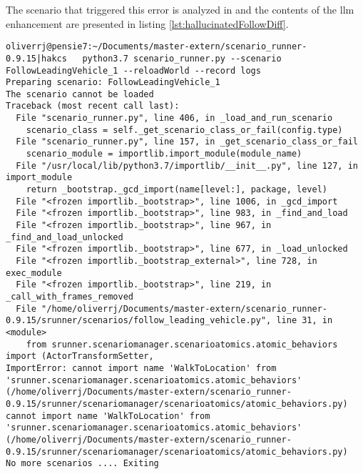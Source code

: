 The scenario that triggered this error is analyzed in  and the
contents of the \acrshort{llm} enhancement are presented in listing
\ref{lst:hallucinatedFollowDiff}.


\begin{lstlisting}[caption={Error message when running the the strictly enhanced  FollowLeadingVehicle scenario with halluciantion. }, label={lst:hallucinatedFollowErrorStrict}]
oliverrj@pensie7:~/Documents/master-extern/scenario_runner-0.9.15|hakcs   python3.7 scenario_runner.py --scenario FollowLeadingVehicle_1 --reloadWorld --record logs
Preparing scenario: FollowLeadingVehicle_1
The scenario cannot be loaded
Traceback (most recent call last):
  File "scenario_runner.py", line 406, in _load_and_run_scenario
    scenario_class = self._get_scenario_class_or_fail(config.type)
  File "scenario_runner.py", line 157, in _get_scenario_class_or_fail
    scenario_module = importlib.import_module(module_name)
  File "/usr/local/lib/python3.7/importlib/__init__.py", line 127, in import_module
    return _bootstrap._gcd_import(name[level:], package, level)
  File "<frozen importlib._bootstrap>", line 1006, in _gcd_import
  File "<frozen importlib._bootstrap>", line 983, in _find_and_load
  File "<frozen importlib._bootstrap>", line 967, in _find_and_load_unlocked
  File "<frozen importlib._bootstrap>", line 677, in _load_unlocked
  File "<frozen importlib._bootstrap_external>", line 728, in exec_module
  File "<frozen importlib._bootstrap>", line 219, in _call_with_frames_removed
  File "/home/oliverrj/Documents/master-extern/scenario_runner-0.9.15/srunner/scenarios/follow_leading_vehicle.py", line 31, in <module>
    from srunner.scenariomanager.scenarioatomics.atomic_behaviors import (ActorTransformSetter,
ImportError: cannot import name 'WalkToLocation' from 'srunner.scenariomanager.scenarioatomics.atomic_behaviors' (/home/oliverrj/Documents/master-extern/scenario_runner-0.9.15/srunner/scenariomanager/scenarioatomics/atomic_behaviors.py)
cannot import name 'WalkToLocation' from 'srunner.scenariomanager.scenarioatomics.atomic_behaviors' (/home/oliverrj/Documents/master-extern/scenario_runner-0.9.15/srunner/scenariomanager/scenarioatomics/atomic_behaviors.py)
No more scenarios .... Exiting

\end{lstlisting}